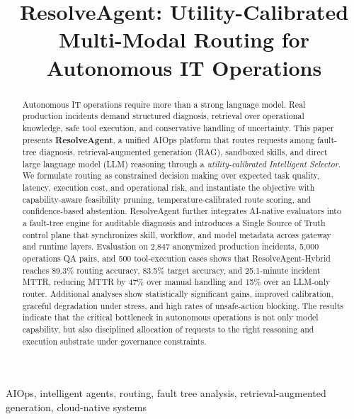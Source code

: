 \documentclass[conference]{IEEEtran}
\title{ResolveAgent: Utility-Calibrated Multi-Modal Routing for Autonomous IT Operations}
\author{\IEEEauthorblockN{Anonymous Authors}}
\begin{document}
\maketitle

\begin{abstract}
Autonomous IT operations require more than a strong language model. Real production incidents demand structured diagnosis, retrieval over operational knowledge, safe tool execution, and conservative handling of uncertainty. This paper presents \textbf{ResolveAgent}, a unified AIOps platform that routes requests among fault-tree diagnosis, retrieval-augmented generation (RAG), sandboxed skills, and direct large language model (LLM) reasoning through a \emph{utility-calibrated Intelligent Selector}. We formulate routing as constrained decision making over expected task quality, latency, execution cost, and operational risk, and instantiate the objective with capability-aware feasibility pruning, temperature-calibrated route scoring, and confidence-based abstention. ResolveAgent further integrates AI-native evaluators into a fault-tree engine for auditable diagnosis and introduces a Single Source of Truth control plane that synchronizes skill, workflow, and model metadata across gateway and runtime layers. Evaluation on 2{,}847 anonymized production incidents, 5{,}000 operations QA pairs, and 500 tool-execution cases shows that ResolveAgent-Hybrid reaches 89.3\% routing accuracy, 83.5\% target accuracy, and 25.1-minute incident MTTR, reducing MTTR by 47\% over manual handling and 15\% over an LLM-only router. Additional analyses show statistically significant gains, improved calibration, graceful degradation under stress, and high rates of unsafe-action blocking. The results indicate that the critical bottleneck in autonomous operations is not only model capability, but also disciplined allocation of requests to the right reasoning and execution substrate under governance constraints.
\end{abstract}

\begin{IEEEkeywords}
AIOps, intelligent agents, routing, fault tree analysis, retrieval-augmented generation, cloud-native systems
\end{IEEEkeywords}
\end{document}

